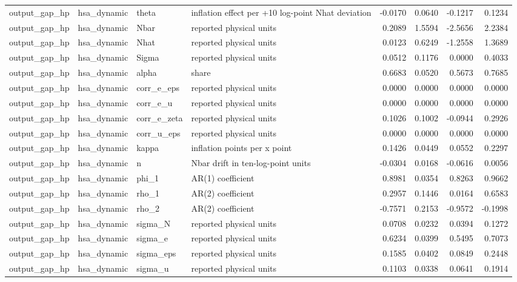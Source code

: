 \begin{tabular}{llllrrrr}
output\_gap\_hp & hsa\_dynamic & theta & inflation effect per +10 log-point Nhat deviation & -0.0170 & 0.0640 & -0.1217 & 0.1234 \\
output\_gap\_hp & hsa\_dynamic & Nbar & reported physical units & 0.2089 & 1.5594 & -2.5656 & 2.2384 \\
output\_gap\_hp & hsa\_dynamic & Nhat & reported physical units & 0.0123 & 0.6249 & -1.2558 & 1.3689 \\
output\_gap\_hp & hsa\_dynamic & Sigma & reported physical units & 0.0512 & 0.1176 & 0.0000 & 0.4033 \\
output\_gap\_hp & hsa\_dynamic & alpha & share & 0.6683 & 0.0520 & 0.5673 & 0.7685 \\
output\_gap\_hp & hsa\_dynamic & corr\_e\_eps & reported physical units & 0.0000 & 0.0000 & 0.0000 & 0.0000 \\
output\_gap\_hp & hsa\_dynamic & corr\_e\_u & reported physical units & 0.0000 & 0.0000 & 0.0000 & 0.0000 \\
output\_gap\_hp & hsa\_dynamic & corr\_e\_zeta & reported physical units & 0.1026 & 0.1002 & -0.0944 & 0.2926 \\
output\_gap\_hp & hsa\_dynamic & corr\_u\_eps & reported physical units & 0.0000 & 0.0000 & 0.0000 & 0.0000 \\
output\_gap\_hp & hsa\_dynamic & kappa & inflation points per x point & 0.1426 & 0.0449 & 0.0552 & 0.2297 \\
output\_gap\_hp & hsa\_dynamic & n & Nbar drift in ten-log-point units & -0.0304 & 0.0168 & -0.0616 & 0.0056 \\
output\_gap\_hp & hsa\_dynamic & phi\_1 & AR(1) coefficient & 0.8981 & 0.0354 & 0.8263 & 0.9662 \\
output\_gap\_hp & hsa\_dynamic & rho\_1 & AR(2) coefficient & 0.2957 & 0.1446 & 0.0164 & 0.6583 \\
output\_gap\_hp & hsa\_dynamic & rho\_2 & AR(2) coefficient & -0.7571 & 0.2153 & -0.9572 & -0.1998 \\
output\_gap\_hp & hsa\_dynamic & sigma\_N & reported physical units & 0.0708 & 0.0232 & 0.0394 & 0.1272 \\
output\_gap\_hp & hsa\_dynamic & sigma\_e & reported physical units & 0.6234 & 0.0399 & 0.5495 & 0.7073 \\
output\_gap\_hp & hsa\_dynamic & sigma\_eps & reported physical units & 0.1585 & 0.0402 & 0.0849 & 0.2448 \\
output\_gap\_hp & hsa\_dynamic & sigma\_u & reported physical units & 0.1103 & 0.0338 & 0.0641 & 0.1914 \\

\end{tabular}
